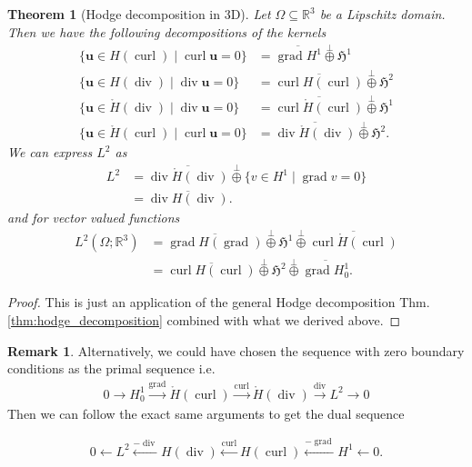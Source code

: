 \documentclass[12pt,a4paper]{article}
\numberwithin{equation}{subsection}
\numberwithin{lemma}{subsection}
\newtheorem{theorem}[lemma]{Theorem}
\theoremstyle{definition}
\newtheorem{remark}[lemma]{Remark}
\DeclareMathOperator{\curl}{curl}
\DeclareMathOperator{\diver}{div}
\DeclareMathOperator{\grad}{grad}
\newcommand{\real}{\mathbb{R}}
\begin{document}
\begin{theorem}[Hodge decomposition in 3D]
    Let $\Omega \subseteq \real^3$ be a Lipschitz domain. Then we have the 
    following decompositions of the kernels
    \begin{align*}
        \{ \mathbf{u} \in H(\curl) \mid \curl \mathbf{u} = 0\}
        &= \overline{\grad H^1} \stackrel{\perp}{\oplus} 
            \mathfrak{H}^1
        \\ \{ \mathbf{u} \in H(\diver) \mid \diver \mathbf{u} = 0\}
        &= \overline{\curl H(\curl)} \stackrel{\perp}{\oplus} 
            \mathfrak{H}^2
        \\ \{ \mathbf{u} \in \mathring{H}(\diver) \mid \diver \mathbf{u} = 0\}
        &= \overline{\curl \mathring{H}(\curl)} \stackrel{\perp}{\oplus} 
            \mathfrak{H}^1
        \\ \{ \mathbf{u} \in \mathring{H}(\curl) \mid \curl \mathbf{u} = 0\}
        &= \overline{\diver \mathring{H}(\diver)} \stackrel{\perp}{\oplus} 
            \mathfrak{H}^2.
    \end{align*}
    We can express $L^2$ as
    \begin{align*}
        L^2 &= \overline{\diver \mathring{H}(\diver)} \stackrel{\perp}{\oplus} 
            \{ v \in H^1 \mid \grad v = 0 \}
        \\ &= \overline{\diver H(\diver)}.
    \end{align*}
    and for vector valued functions
    \begin{align*}
        L^2(\Omega;\real^3) &= \overline{\grad H(\grad)} 
            \stackrel{\perp}{\oplus} \mathfrak{H}^1 
            \stackrel{\perp}{\oplus} \overline{\curl \mathring{H}(\curl)} 
        \\ &= \overline{\curl H(\curl)}
            \stackrel{\perp}{\oplus} \mathfrak{H}^2
            \stackrel{\perp}{\oplus} \overline{\grad H^1_0}.
    \end{align*}
\end{theorem}
\begin{proof}
    This is just an application of the general Hodge decomposition 
    Thm.\,\ref{thm:hodge_decomposition} combined with what we derived above.
\end{proof}


\begin{remark}
    Alternatively, we could have chosen the sequence with zero boundary conditions
    as the primal sequence i.e. 
    \begin{align*}
        0 \rightarrow H^1_0 \xrightarrow{\grad} \mathring{H}(\curl)
        \xrightarrow{\curl} \mathring{H}(\diver) 
        \xrightarrow{\diver} L^2 \rightarrow 0
    \end{align*}
    Then we can follow the exact same arguments to get the dual sequence 

    \begin{align*}
        0 \leftarrow L^2 \xleftarrow{-\diver} H(\diver)
            \xleftarrow{\curl} H(\curl) 
            \xleftarrow{-\grad} H^1 \leftarrow 0.
    \end{align*}
\end{remark}
\end{document}
